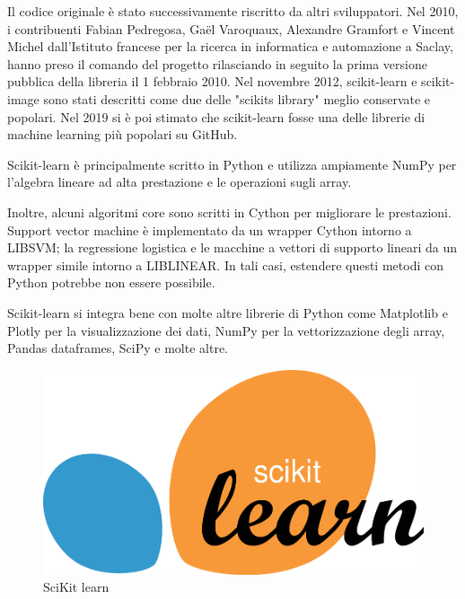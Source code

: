 Il codice originale è stato successivamente riscritto da altri sviluppatori. Nel 2010, i contribuenti Fabian Pedregosa, Gaël Varoquaux, Alexandre Gramfort e Vincent Michel dall'Istituto francese per la ricerca in informatica e automazione a Saclay, hanno preso il comando del progetto rilasciando in  seguito la prima versione pubblica della libreria il 1 febbraio 2010. Nel novembre 2012, scikit-learn e scikit-image sono stati descritti come due delle "scikits library" meglio conservate e popolari. 
Nel 2019 si è poi stimato che scikit-learn fosse una delle librerie di machine learning più popolari su GitHub.

Scikit-learn è principalmente scritto in Python e utilizza ampiamente NumPy per l'algebra lineare ad alta prestazione e le operazioni sugli array. 

Inoltre, alcuni algoritmi core sono scritti in Cython per migliorare le prestazioni. Support vector machine è implementato da un wrapper Cython intorno a LIBSVM; la regressione logistica e le macchine a vettori di supporto lineari da un wrapper simile intorno a LIBLINEAR. In tali casi, estendere questi metodi con Python potrebbe non essere possibile.

Scikit-learn si integra bene con molte altre librerie di Python come Matplotlib e Plotly per la visualizzazione dei dati, NumPy per la vettorizzazione degli array, Pandas dataframes, SciPy e molte altre.

\begin{figure}
    \begin{center}    
        \includegraphics[width=0.7 \linewidth]{images/image9.png}
        \caption{SciKit learn}
    \end{center}
\end{figure}

